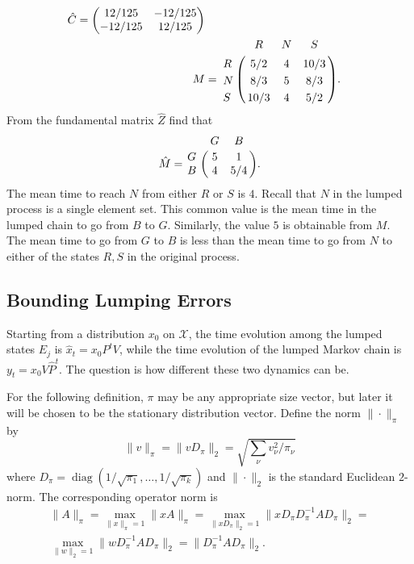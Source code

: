 \documentclass[12pt]{article}
\begin{document}
\begin{example}
          \begin{align*}
        \hat{C} =
        \begin{pmatrix}
            12/125 & -12/125 \\
            -12/125 & 12/125
        \end{pmatrix}
        \\
        M &= \bordermatrix{ & R & N & S \cr
        R & 5/2 & 4 & 10/3 \cr
        N & 8/3 & 5 & 8/3 \cr
        S & 10/3 & 4 & 5/2}.
    \end{align*}
    From the fundamental matrix \( \hat{Z} \) find that
    \[
        \hat{M} = \bordermatrix{ & G & B \cr
        G & 5 & 1 \cr
        B & 4 & 5/4 }.
    \] The mean time to reach \( N \) from either \( R \) or \( S \) is \(
    4 \).  Recall that \( N \) in the lumped process is a single element
    set.  This common value is the mean time in the lumped chain to go
    from \( B \) to \( G \).  Similarly, the value \( 5 \) is obtainable
    from \( M \).  The mean time to go from \( G \) to \( B \) is less
    than the mean time to go from \( N \) to either of the states \( R,S \)
    in the original process.
\end{example}

\subsection*{Bounding Lumping Errors}

Starting from a distribution \( x_0 \) on \( \mathcal{X} \), the time
evolution among the lumped states \( E_j \) is \( \hat{x}_{t} = x_0 P^t
V \), while the time evolution of the lumped Markov chain is \( y_t = x_0V
\hat{P}^t \).  The question is how different these two dynamics can be.

For the following definition, \( \pi \) may be any appropriate size vector, but later
it will be chosen to be the stationary distribution vector.
Define the norm \( \| \cdot \|_{\pi} \) by
\[
    \| v\|_{\pi} = \| v D_{\pi} \|_2 = \sqrt{\sum_{\nu} v_{\nu}^2/\pi_\nu}
\] where \( D_{\pi} =
\operatorname{diag}
(1/\sqrt{\pi_1}, \dots, 1/\sqrt{\pi_k}) \) and \( \| \cdot \|_2 \) is
the standard Euclidean \( 2 \)-norm.  The corresponding operator norm is
\begin{multline*}
    \| A \|_{\pi} = \max_{\|x\|_{\pi}=1}\|xA\|_{\pi} = \max_{\|xD_{\pi}\|_2
    = 1}\|x D_{\pi} D_{\pi}^{-1} A D_{\pi}\|_{2} = \\
    \max_{\|w\|_2 = 1}\|w D_{\pi}^{-1} A D_{\pi}\|_{2} = \| D_{\pi}^{-1}
    A D_{\pi}\|_{2}.
\end{multline*}
\end{document}
